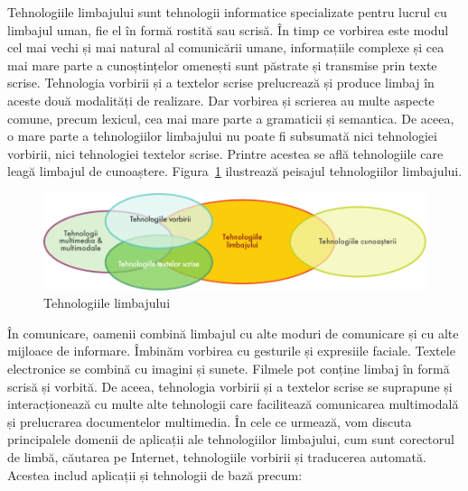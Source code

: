 \begin{multicols}{2}

Tehnologiile limbajului sunt tehnologii informatice specializate pentru lucrul cu limbajul uman, fie el în formă rostită sau scrisă. În timp ce vorbirea este modul cel mai vechi și mai natural al comunicării umane, informațiile complexe și cea mai mare parte a cunoștințelor omenești sunt păstrate și transmise prin texte scrise. Tehnologia vorbirii și a textelor scrise prelucrează și produce limbaj în aceste două modalități de realizare. Dar vorbirea și scrierea au multe aspecte comune, precum lexicul, cea mai mare parte a gramaticii și semantica. De aceea, o mare parte a tehnologiilor limbajului nu poate fi subsumată nici tehnologiei vorbirii, nici tehnologiei textelor scrise. Printre acestea se află tehnologiile care leagă limbajul de cunoaștere. Figura~\ref{fig:ltincontext_de} ilustrează peisajul tehnologiilor limbajului.

\begin{figure}[htb]
\center
\includegraphics[width=\textwidth]{../_media/romanian/language_technologies}
\caption{Tehnologiile limbajului}
\label{fig:ltincontext_de}
\vspace{-15mm}
\end{figure}

În comunicare, oamenii combină limbajul cu alte moduri de comunicare și cu alte mijloace de informare. Îmbinăm vorbirea cu gesturile și expresiile faciale. Textele electronice se combină cu imagini și sunete. Filmele pot conține limbaj în formă scrisă și vorbită. De aceea, tehnologia vorbirii și a textelor scrise se suprapune și interacționează cu multe alte tehnologii care facilitează comunicarea multimodală și prelucrarea documentelor multimedia.
În cele ce urmează, vom discuta principalele domenii de aplicații ale tehnologiilor limbajului, cum sunt corectorul de limbă, căutarea pe Internet, tehnologiile vorbirii și traducerea automată. Acestea includ aplicații și tehnologii de bază precum:


\end{multicols}
